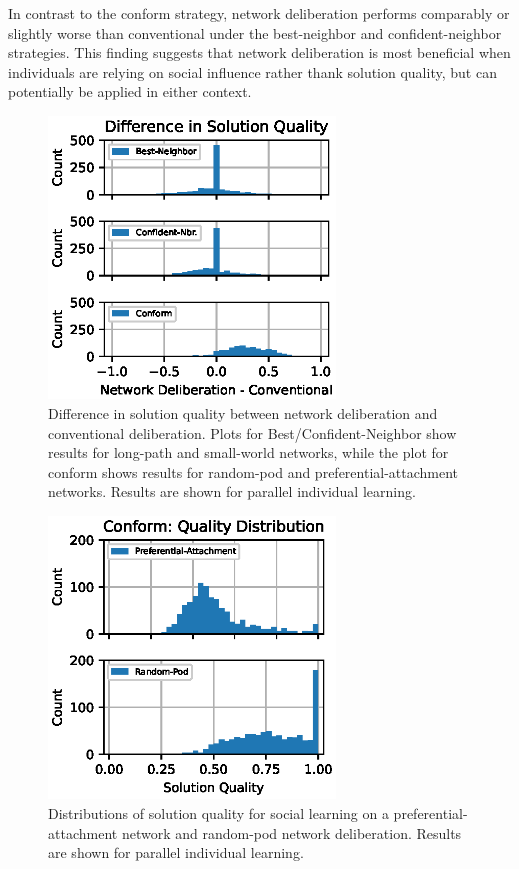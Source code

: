 In contrast to the conform strategy, network deliberation performs comparably or slightly worse than conventional under the best-neighbor and confident-neighbor strategies. This finding suggests that network deliberation is most beneficial when individuals are relying on social influence rather thank solution quality, but can potentially be applied in either context.

\begin{figure}
    \centering
    \includegraphics[width=3in]{chapters/figures/NetDelibABM/fig-results-netdelib-diff.eps}
	\caption{Difference in solution quality between network deliberation and conventional deliberation. Plots for Best/Confident-Neighbor show results for long-path and small-world networks, while the plot for conform shows results for random-pod and preferential-attachment networks. Results are shown for parallel individual learning.}
    \label{fig:results-conform-diff}
\end{figure}

\begin{figure}
    \centering
    \includegraphics[width=3in]{chapters/figures/NetDelibABM/fig-results-conform-dist.eps}
	\caption{Distributions of solution quality for social learning on a preferential-attachment network and random-pod network deliberation. Results are shown for parallel individual learning.}
    \label{fig:results-conform-dist}
\end{figure}


